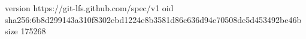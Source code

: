 version https://git-lfs.github.com/spec/v1
oid sha256:6b8d299143a310f8302ebd1224e8b3581d86c636d94e70508de5d453492be46b
size 175268
